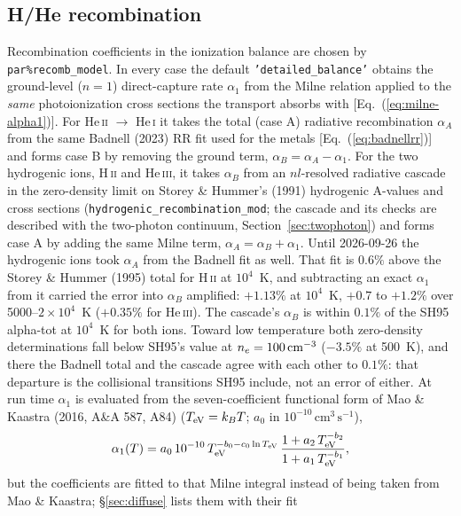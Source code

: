 \documentclass[english,a4paper]{my_memo}
\newcommand{\code}[1]{\texttt{#1}}
\newcommand{\cmc}{\mathrm{cm^{3}\,s^{-1}}}
\begin{document}
\subsection{H/He recombination}
\label{sec:hherec}
Recombination coefficients in the ionization balance are chosen by
\code{par\%recomb\_model}.  In every case the default \code{'detailed\_balance'}
obtains the ground-level ($n{=}1$) direct-capture rate $\alpha_1$ from the
Milne relation applied to the \emph{same} photoionization cross sections the
transport absorbs with [Eq.~(\ref{eq:milne-alpha1})].  For He\,\textsc{ii}
$\to$ He\,\textsc{i} it takes the total (case A) radiative recombination
$\alpha_A$ from the same Badnell (2023) RR fit used for the metals
[Eq.~(\ref{eq:badnellrr})] and forms case B by removing the ground term,
$\alpha_B = \alpha_A - \alpha_1$.  For the two hydrogenic ions,
H\,\textsc{ii} and He\,\textsc{iii}, it takes $\alpha_B$ from an
$nl$-resolved radiative cascade in the zero-density limit on Storey \&
Hummer's (1991) hydrogenic A-values and cross sections
(\code{hydrogenic\_recombination\_mod}; the cascade and its checks are
described with the two-photon continuum, Section~\ref{sec:twophoton}) and
forms case A by adding the same Milne term, $\alpha_A = \alpha_B + \alpha_1$.
Until 2026-09-26 the hydrogenic ions took $\alpha_A$ from the Badnell fit as
well.  That fit is $0.6\%$ above the Storey \& Hummer (1995) total for
H\,\textsc{ii} at $10^4$~K, and subtracting an exact $\alpha_1$ from it
carried the error into $\alpha_B$ amplified: $+1.13\%$ at $10^4$~K, $+0.7$
to $+1.2\%$ over 5000--$2{\times}10^4$~K ($+0.35\%$ for He\,\textsc{iii}).
The cascade's $\alpha_B$ is within $0.1\%$ of the SH95 alpha-tot at
$10^4$~K for both ions.  Toward low temperature both zero-density
determinations fall below SH95's value at $n_e = 100\,{\rm cm^{-3}}$
($-3.5\%$ at 500~K), and there the Badnell total and the cascade agree
with each other to $0.1\%$: that departure is the collisional transitions
SH95 include, not an error of either.  At run time
$\alpha_1$ is evaluated from the seven-coefficient functional form of
Mao \& Kaastra (2016, A\&A 587, A84) ($T_{\rm eV} = k_B T$; $a_0$ in
$10^{-10}\,\cmc$),
\begin{equation}
  \alpha_1(T) = a_0\,10^{-10}\,
  T_{\rm eV}^{-b_0 - c_0\ln T_{\rm eV}}\,
  \frac{1 + a_2\,T_{\rm eV}^{-b_2}}{1 + a_1\,T_{\rm eV}^{-b_1}},
  \label{eq:mao}
\end{equation}
but the coefficients are fitted to that Milne integral instead of being
taken from Mao \& Kaastra; \S\ref{sec:diffuse} lists them with their fit
\end{document}
